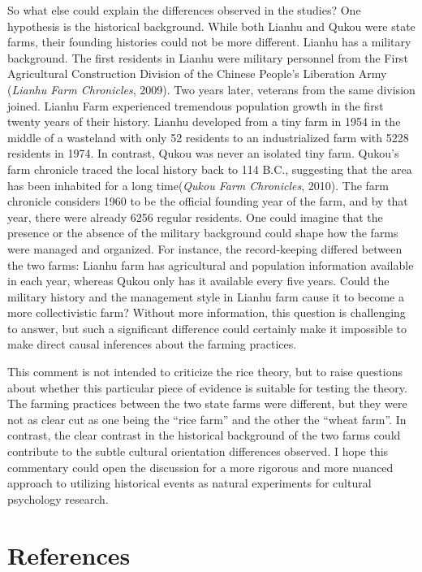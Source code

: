 \documentclass[
  man]{apa6}
\begin{document}
So what else could explain the differences observed in the studies? One hypothesis is the historical background. While both Lianhu and Qukou were state farms, their founding histories could not be more different. Lianhu has a military background. The first residents in Lianhu were military personnel from the First Agricultural Construction Division of the Chinese People's Liberation Army (\emph{Lianhu Farm Chronicles}, 2009). Two years later, veterans from the same division joined. Lianhu Farm experienced tremendous population growth in the first twenty years of their history. Lianhu developed from a tiny farm in 1954 in the middle of a wasteland with only 52 residents to an industrialized farm with 5228 residents in 1974. In contrast, Qukou was never an isolated tiny farm. Qukou's farm chronicle traced the local history back to 114 B.C., suggesting that the area has been inhabited for a long time(\emph{Qukou Farm Chronicles}, 2010). The farm chronicle considers 1960 to be the official founding year of the farm, and by that year, there were already 6256 regular residents. One could imagine that the presence or the absence of the military background could shape how the farms were managed and organized. For instance, the record-keeping differed between the two farms: Lianhu farm has agricultural and population information available in each year, whereas Qukou only has it available every five years. Could the military history and the management style in Lianhu farm cause it to become a more collectivistic farm? Without more information, this question is challenging to answer, but such a significant difference could certainly make it impossible to make direct causal inferences about the farming practices.

This comment is not intended to criticize the rice theory, but to raise questions about whether this particular piece of evidence is suitable for testing the theory. The farming practices between the two state farms were different, but they were not as clear cut as one being the ``rice farm'' and the other the ``wheat farm''. In contrast, the clear contrast in the historical background of the two farms could contribute to the subtle cultural orientation differences observed. I hope this commentary could open the discussion for a more rigorous and more nuanced approach to utilizing historical events as natural experiments for cultural psychology research.

\newpage

\hypertarget{references}{%
\section{References}\label{references}}
\end{document}
